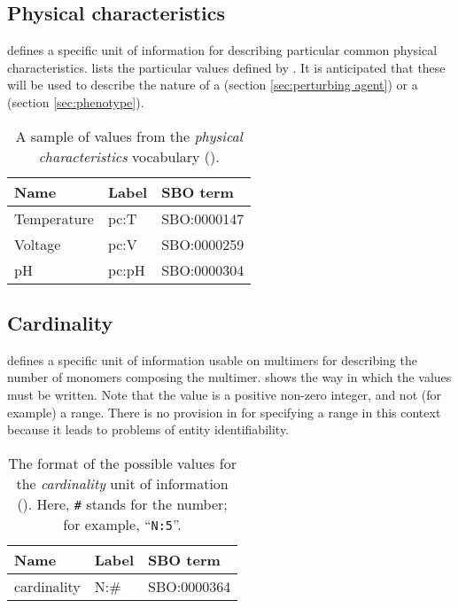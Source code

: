 \subsection{Physical characteristics}
\label{sec:physical-characteristics-cv}

\SBGNPDLone defines a specific unit of information for describing particular common physical characteristics.  
 lists the particular values defined by \SBGNPDLone.  %
It is anticipated that these will be used to describe the nature of a  (section \ref{sec:perturbing agent}) or a  (section \ref{sec:phenotype}).

\begin{table}[h]
  \centering
  \begin{tabular}{l>{\ttfamily}l>{\ttfamily}l}
    \toprule
    \textbf{Name}   & \textbf{\rmfamily Label} & \textbf{\rmfamily SBO term} \\
    \midrule
    Temperature   & pc:T  & SBO:0000147\\
    Voltage       & pc:V  & SBO:0000259\\
    pH            & pc:pH & SBO:0000304\\
    \bottomrule
  \end{tabular}
  \caption{A sample of values from the \emph{physical
      characteristics} vocabulary ().}
  \label{tab:physical-characteristics-cv}
\end{table}

\subsection{Cardinality}
\label{sec:cardinality-cv}

\SBGNPDLone defines a specific unit of information usable on multimers for describing the number of monomers composing the multimer.   shows the way in which the values must be written.  Note that the value is a positive non-zero integer, and not (for example) a range.  There is no provision in \SBGNPDLone for specifying a range in this context because it leads to problems of entity identifiability.

\begin{table}[h]
  \centering
  \begin{tabular}{l>{\ttfamily}l>{\ttfamily}l}
    \toprule
    \textbf{Name}   & \textbf{\rmfamily Label} & \textbf{\rmfamily SBO term} \\
    \midrule
    cardinality    & N:\#  & SBO:0000364\\
    \bottomrule
  \end{tabular}
  \caption{The format of the possible values for the
    \emph{cardinality} unit of information
    ().  Here, \texttt{\#} stands for the
    number; for example, ``\texttt{N:5}''.}
  \label{tab:cardinality-cv}
\end{table}

